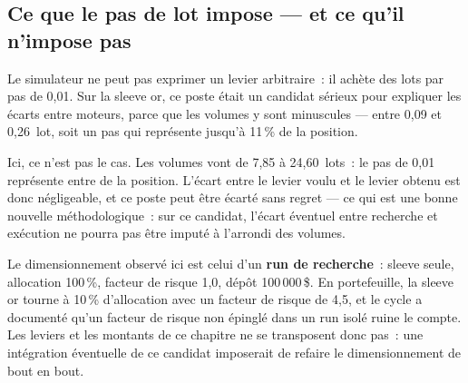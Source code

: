 \subsection{Ce que le pas de lot impose --- et ce qu'il n'impose pas}

Le simulateur ne peut pas exprimer un levier arbitraire~: il achète des lots
par pas de 0,01. Sur la sleeve or, ce poste était un candidat sérieux pour
expliquer les écarts entre moteurs, parce que les volumes y sont minuscules ---
entre 0,09 et 0,26~lot, soit un pas qui représente jusqu'à 11\,\% de la
position.

Ici, ce n'est pas le cas. Les volumes vont de 7,85 à 24,60~lots~: le pas de
0,01 représente entre  de la position. L'écart entre
le levier voulu et le levier obtenu est donc négligeable, et ce poste peut être
écarté sans regret --- ce qui est une bonne nouvelle méthodologique~: sur ce
candidat, l'écart éventuel entre recherche et exécution ne pourra pas être
imputé à l'arrondi des volumes.

\begin{warningbox}
Le dimensionnement observé ici est celui d'un \textbf{run de recherche}~:
sleeve seule, allocation 100\,\%, facteur de risque 1,0, dépôt 100\,000\,\$. En
portefeuille, la sleeve or tourne à 10\,\% d'allocation avec un facteur de
risque de 4,5, et le cycle a documenté qu'un facteur de risque non épinglé dans
un run isolé ruine le compte. Les leviers et les montants de ce chapitre ne se
transposent donc pas~: une intégration éventuelle de ce candidat imposerait de
refaire le dimensionnement de bout en bout.
\end{warningbox}
